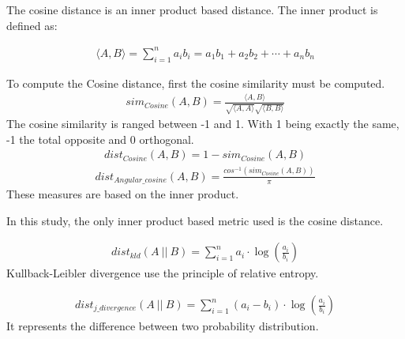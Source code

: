 \begin{definition}
  \label{def:cosine_dist}
  The cosine distance is an inner product based distance.
  The inner product is defined as:

  \begin{gather*}
    \langle A, B \rangle = \sum_{i=1}^{n} a_i b_i = a_1 b_1 + a_2 b_2 + \cdots + a_n b_n
  \end{gather*}

  To compute the Cosine distance, first the cosine similarity must be computed.
  \begin{gather*}
    sim_{Cosine}(A, B) = \frac{\langle A, B \rangle}{\sqrt{\langle A , A \rangle}\sqrt{\langle B, B \rangle}}
  \end{gather*}
  The cosine similarity is ranged between -1 and 1.
  With 1 being exactly the same, -1 the total opposite and 0 orthogonal.
  \begin{gather*}
    dist_{Cosine}(A, B) = 1 - sim_{Cosine}(A, B)
  \end{gather*}
  \begin{gather*}
    dist_{Angular\_cosine}(A, B) = \frac{cos^{-1}\left( sim_{Cosine}(A, B) \right)}{\pi}
  \end{gather*}
  These measures are based on the inner product.

  In this study, the only inner product based metric used is the cosine distance.
\end{definition}

\begin{definition}
  \begin{gather*}
    dist_{kld}(A\ ||\ B) = \sum_{i=1}^{n} a_i \cdot \log(\frac{a_i}{b_i})
  \end{gather*}
  Kullback-Leibler divergence use the principle of relative entropy.
\end{definition}

\begin{definition}
  \begin{gather*}
    dist_{j\_divergence}(A\ ||\ B) = \sum_{i=1}^{n} (a_i - b_i) \cdot \log(\frac{a_i}{b_i})
  \end{gather*}
  It represents the difference between two probability distribution.
\end{definition}
